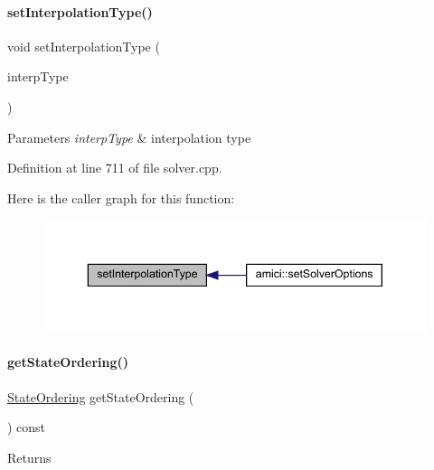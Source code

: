 \paragraph{\texorpdfstring{set\+Interpolation\+Type()}{setInterpolationType()}}
{\footnotesize\ttfamily void set\+Interpolation\+Type (\begin{DoxyParamCaption}\item[{\mbox{\hyperlink{namespaceamici_a8472f01c511d77bbfb981a46618ea1ea}{Interpolation\+Type}}}]{interp\+Type }\end{DoxyParamCaption})}


\begin{DoxyParams}{Parameters}
{\em interp\+Type} & interpolation type \\
\hline
\end{DoxyParams}


Definition at line 711 of file solver.\+cpp.

Here is the caller graph for this function\+:
\nopagebreak
\begin{figure}[H]
\begin{center}
\leavevmode
\includegraphics[width=343pt]{classamici_1_1_solver_a9d9a0a5f8cdfdb993960706c646e240f_icgraph}
\end{center}
\end{figure}
\mbox{\label{classamici_1_1_solver_ac758cf7c51f50db18ea58898623ce12c}} 
\paragraph{\texorpdfstring{get\+State\+Ordering()}{getStateOrdering()}}
{\footnotesize\ttfamily \mbox{\hyperlink{namespaceamici_a890d968060d6d830aeed98dbeb04447f}{State\+Ordering}} get\+State\+Ordering (\begin{DoxyParamCaption}{ }\end{DoxyParamCaption}) const}

\begin{DoxyReturn}{Returns}

\end{DoxyReturn}


